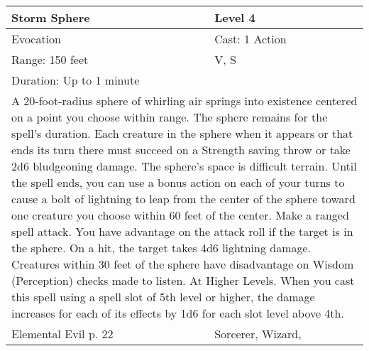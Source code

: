 \documentclass[11pt]{report}
\begin{document}
\begin{table}[H]
	\begin{tabular}{||p{6cm}|p{6cm}||}
		\hline\hline
		\bf{Storm Sphere} & Level 4\\ \hline
		Evocation & Cast: 1 Action\\ \hline
		Range: 150 feet & V, S\\ \hline
		Duration: Up to 1 minute & \\ \hline
		\multicolumn{2}{||p{12cm}||}{A 20-foot-radius sphere of whirling air springs into existence centered on a point you choose within range. The sphere remains for the spell’s duration. Each creature in the sphere when it appears or that ends its turn there must succeed on a Strength saving throw or take 2d6 bludgeoning damage. The sphere’s space is difficult terrain.
Until the spell ends, you can use a bonus action on each of your turns to cause a bolt of lightning to leap from the center of the sphere toward one creature you choose within 60 feet of the center. Make a ranged spell attack. You have advantage on the attack roll if the target is in the sphere. On a hit, the target takes 4d6 lightning damage.
Creatures within 30 feet of the sphere have disadvantage on Wisdom (Perception) checks made to listen.
At Higher Levels. When you cast this spell using a spell slot of 5th level or higher, the damage increases for each of its effects by 1d6 for each slot level above 4th.}\\ \hline
Elemental Evil p. 22 & Sorcerer, Wizard, \\ \hline\hline
	\end{tabular}
\end{table}
\end{document}
